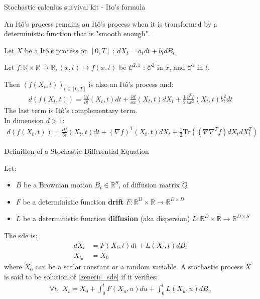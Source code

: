 %
%

\begin{frame}{Stochastic calculus survival kit - Ito's formula}
    
\begin{theorem}
An Itô's process remains an Itô's process when it is transformed by a deterministic function that is "smooth enough".

Let $X$ be a Itô's process on $[0,T]$ : $dX_t = a_tdt + b_t dB_t$.

Let $f : \mathbb{R} \times \mathbb{R} \rightarrow \mathbb{R}, (x,t) \mapsto f(x,t)$ be 
$\mathcal{C}^{2,1}$ : $\mathcal{C}^2$ in $x$, and $\mathcal{C}^1$ in $t$.

Then $(f(X_t,t))_{t \in [0,T]}$ is also an Itô's process and:
\begin{align}
    d\left( f(X_t,t) \right) = \frac{\partial f}{\partial t}(X_t,t) dt + \frac{\partial f}{\partial x}(X_t,t) dX_t + \frac{1}{2}\frac{\partial^2 f}{\partial x^2}(X_t,t)b_t^2 dt
\end{align}
The last term is Itô's complementary term.\\
In dimension $d > 1$:
\begin{align}
    d\left( f(X_t,t) \right) = \frac{\partial f}{\partial t}(X_t,t) dt + (\nabla f)^T (X_t,t) dX_t + \frac{1}{2}\text{Tr} \left( (\nabla \nabla^T f) dX_t dX_t^T \right)
\end{align}
\end{theorem}
\end{frame}

%
%

\begin{frame}{Definition of a Stochastic Differential Equation}
    \begin{definition}
            Let:
    \begin{itemize}
        \item $B$ be a Brownian motion $B_t \in \mathbb{R}^S$, of diffusion matrix $Q$
        \item $F$ be a deterministic function \textbf{drift} $F : \mathbb{R}^D \times \mathbb{R}\rightarrow \mathbb{R}^{D \times D}$
        \item $L$ be a deterministic function \textbf{diffusion} (aka dispersion) $L : \mathbb{R}^D \times \mathbb{R}\rightarrow \mathbb{R}^{D \times S}$ 
    \end{itemize}

    The \gls{sde} is:
    \begin{align}
        \label{generic_sde}
        dX_t &= F(X_t,t) dt + L(X_t,t) dB_t \\
        X_{t_0} &= X_0
    \end{align}
    where $X_0$ can be a scalar constant or a random variable.
    A stochastic process $X$ is said to be solution of \ref{generic_sde} if it verifies:
    \begin{align*}
        \forall t, \,\, X_t = X_0 + \int_{0}^{t} F(X_u, u)du + \int_{0}^{t} L(X_u,u) dB_u
    \end{align*}
    \end{definition}
\end{frame}

